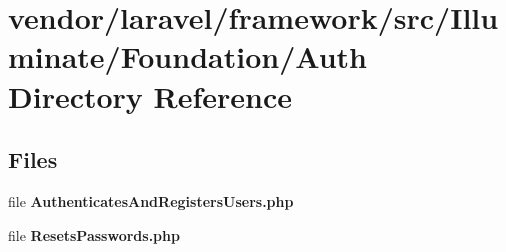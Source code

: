 \section{vendor/laravel/framework/src/\+Illuminate/\+Foundation/\+Auth Directory Reference}
\label{dir_d072eff1481cc1238448fb956118a155}
\subsection*{Files}
\begin{DoxyCompactItemize}
\item 
file {\bf Authenticates\+And\+Registers\+Users.\+php}
\item 
file {\bf Resets\+Passwords.\+php}
\end{DoxyCompactItemize}
